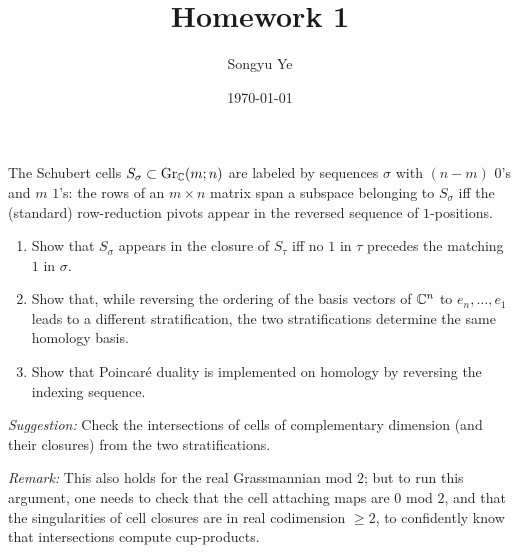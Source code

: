 \documentclass[12pt]{article}  %
\title{Homework 1}
\author{Songyu Ye}
\date{\today}
\begin{document}
\psettitle
\begin{problem}[1]
The Schubert cells $S_{\sigma} \subset \operatorname{Gr}_{\mathbb{C}}(m;n)$ are labeled by sequences $\sigma$ with $(n-m)$ $0$'s and $m$ $1$'s: the
rows of an $m\times n$ matrix span a subspace belonging to $S_{\sigma}$ iff the (standard) row-reduction pivots
appear in the reversed sequence of $1$-positions.
\begin{enumerate}
\item Show that $S_{\sigma}$ appears in the closure of $S_{\tau}$ iff no $1$ in $\tau$ precedes the matching $1$ in $\sigma$.
\item Show that, while reversing the ordering of the basis vectors of $\mathbb{C}^n$ to $e_n,\dots,e_1$ leads to a
different stratification, the two stratifications determine the same homology basis.
\item Show that Poincar\'e duality is implemented on homology by reversing the indexing sequence.
\end{enumerate}
\noindent\textit{Suggestion:} Check the intersections of cells of complementary dimension (and their closures)
from the two stratifications.

\noindent\textit{Remark:} This also holds for the real Grassmannian mod $2$; but to run this argument, one needs
to check that the cell attaching maps are $0$ mod $2$, and that the singularities of cell closures are in
real codimension $\ge 2$, to confidently know that intersections compute cup-products.
\end{problem}
\end{document}
